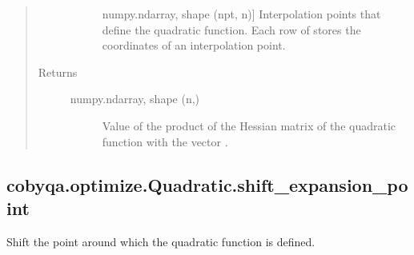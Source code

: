 \documentclass[letterpaper,10pt,english]{sphinxmanual}
\begin{document}
\begin{fulllineitems}
\begin{fulllineitems}
\begin{quote}
\begin{description}
\begin{description}
\item[{}] \leavevmode{[}numpy.ndarray, shape (npt, n){]}
\sphinxAtStartPar
Interpolation points that define the quadratic function. Each row of
 stores the coordinates of an interpolation point.

\end{description}

\item[{Returns}] \leavevmode\begin{description}
\item[{numpy.ndarray, shape (n,)}] \leavevmode
\sphinxAtStartPar
Value of the product of the Hessian matrix of the quadratic function
with the vector .

\end{description}

\end{description}\end{quote}

\end{fulllineitems}



\subsection{cobyqa.optimize.Quadratic.shift\_expansion\_point}
\label{\detokenize{refs/generated/cobyqa.optimize.Quadratic.shift_expansion_point:cobyqa-optimize-quadratic-shift-expansion-point}}\label{\detokenize{refs/generated/cobyqa.optimize.Quadratic.shift_expansion_point::doc}}

\begin{fulllineitems}
\label{\detokenize{refs/generated/cobyqa.optimize.Quadratic.shift_expansion_point:cobyqa.optimize.Quadratic.shift_expansion_point}}
\sphinxAtStartPar
Shift the point around which the quadratic function is defined.


\end{fulllineitems}
\end{fulllineitems}
\end{document}
